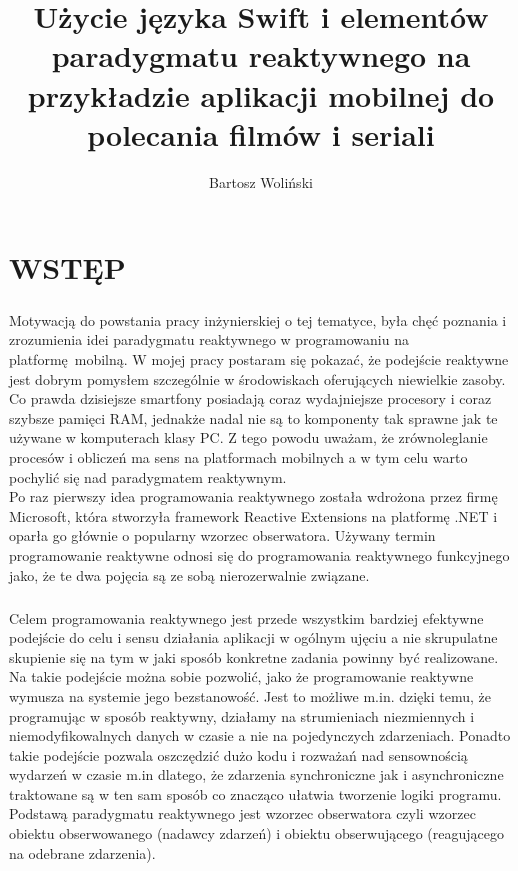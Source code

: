 \documentclass[12pt,oneside,a4paper]{report}
\title{Użycie języka Swift i elementów paradygmatu reaktywnego na przykładzie aplikacji mobilnej do polecania filmów i seriali}
\author{Bartosz Woliński}
\begin{document}
\maketitle
\tableofcontents
\chapter{WSTĘP}

\paragraph{}Motywacją do powstania pracy inżynierskiej o tej tematyce, była chęć poznania i zrozumienia idei paradygmatu reaktywnego w programowaniu na platformę mobilną. W mojej pracy postaram się pokazać, że podejście reaktywne jest dobrym pomysłem szczególnie w środowiskach oferujących niewielkie zasoby. Co prawda dzisiejsze smartfony posiadają coraz wydajniejsze procesory i coraz szybsze pamięci RAM, jednakże nadal nie są to komponenty tak sprawne jak te używane w komputerach klasy PC. Z tego powodu uważam, że zrównoleglanie procesów i obliczeń ma sens na platformach mobilnych a w tym celu warto pochylić się nad paradygmatem reaktywnym.\\ Po raz pierwszy idea programowania reaktywnego została wdrożona przez firmę Microsoft, która stworzyła framework Reactive Extensions na platformę .NET i oparła go głównie o popularny wzorzec obserwatora.\cite{MicrosoftRx} 
Używany termin programowanie reaktywne odnosi się do programowania reaktywnego funkcyjnego jako, że te dwa pojęcia są ze sobą nierozerwalnie związane.
\paragraph{}Celem programowania reaktywnego jest przede wszystkim bardziej efektywne podejście do celu i sensu działania aplikacji w ogólnym ujęciu a nie skrupulatne skupienie się na tym w jaki sposób konkretne zadania powinny być realizowane. Na takie podejście można sobie pozwolić, jako że programowanie reaktywne wymusza na systemie jego bezstanowość. Jest to możliwe m.in. dzięki temu, że programując w sposób reaktywny, działamy na strumieniach niezmiennych i niemodyfikowalnych danych w czasie a nie na pojedynczych zdarzeniach. Ponadto takie podejście pozwala oszczędzić dużo kodu i rozważań nad sensownością wydarzeń w czasie m.in dlatego, że zdarzenia synchroniczne jak i asynchroniczne traktowane są w ten sam sposób co znacząco ułatwia tworzenie logiki programu. Podstawą paradygmatu reaktywnego jest wzorzec obserwatora czyli wzorzec obiektu obserwowanego (nadawcy zdarzeń) i obiektu obserwującego (reagującego na odebrane zdarzenia).
\end{document}
